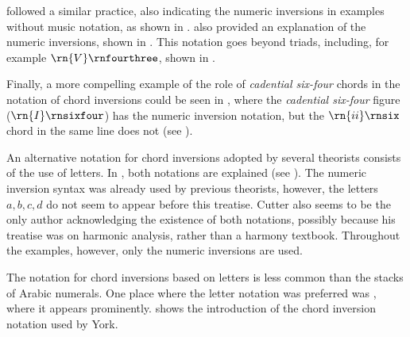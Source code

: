 
\textcite{chadwick1897harmony} followed a similar practice,
also indicating the numeric inversions in examples without
music notation, as shown in
.
\textcite{chadwick1897harmony} also provided an explanation
of the numeric inversions, shown in
. This
notation goes beyond triads, including, for example
$\rn{V}\rnfourthree$, shown in
.

Finally, a more compelling example of the role of
\emph{cadential six-four} chords in the notation of chord
inversions could be seen in
\textcite{loewengard1908lehrbuch}, where the \emph{cadential
six-four} figure ($\rn{I}\rnsixfour$) has the numeric
inversion notation, but the $\rn{ii}\rnsix$ chord in the
same line does not (see
).





An alternative notation for chord inversions adopted by
several theorists consists of the use of letters. In
\textcite{cutter1902harmonic}, both notations are explained
(see ). The
numeric inversion syntax was already used by previous
theorists, however, the letters ${a, b, c , d}$ do not seem
to appear before this treatise. Cutter also seems to be the
only author acknowledging the existence of both notations,
possibly because his treatise was on harmonic analysis,
rather than a harmony textbook. Throughout the examples,
however, only the numeric inversions are used.



The notation for chord inversions based on letters is less
common than the stacks of Arabic numerals. One place where
the letter notation was preferred was
\textcite{york1909practical}, where it appears prominently.
 shows the
introduction of the chord inversion notation used by York.
